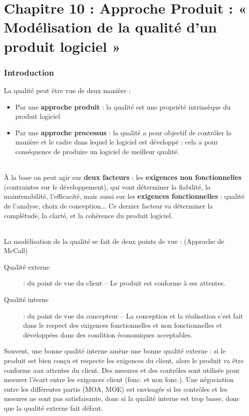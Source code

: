\part{Chapitre 10 : Approche Produit : « Modélisation de la qualité d’un produit logiciel »}

\section{Introduction}

La qualité peut être vue de deux manière :
\begin{itemize}
\item Par une \textbf{approche produit} : la qualité est une propriété intrinsèque du produit logiciel
\item Par une \textbf{approche processus} : la qualité a pour objectif de contrôler la manière et le cadre 	dans lequel le logiciel est développé : cela a pour conséquence de produire un logiciel de meilleur qualité.
\end{itemize}

\hfill\\

À la base on peut agir sur \textbf{deux facteurs} : les \textbf{exigences non fonctionnelles} (contraintes sur le développement), qui vont déterminer la fiabilité, la maintenabilité, l'efficacité, mais aussi sur les \textbf{exigences fonctionnelles} : qualité de l'analyse, choix de conception... Ce dernier facteur va déterminer la complétude, la clarté, et la cohérence du produit logiciel.

\hfill\\

La modélisation de la qualité se fait de deux points de vue : (Approche de McCall)
\begin{description}
\item[Qualité externe] : du point de vue du client – Le produit est conforme à ses attentes.
\item[Qualité interne] : du point  de vue du concepteur – La conception et la réalisation s'est fait dans le respect des exigences fonctionnelles et non fonctionnelles et développées dans des condition économiques acceptables.
\end{description}

Souvent, une bonne qualité interne amène une bonne qualité externe : si le produit est bien conçu et respecte les exigences du client, alors le produit va être conforme aux attentes du client. Des mesures et des contrôles sont utilisée pour mesurer l'écart entre les exigences client (fonc. et non fonc.). Une négociation entre les différentes partis (MOA, MOE) est envisagée si les contrôles et les mesures ne sont pas satisfaisante, donc si la qualité interne est trop basse, donc que la qualité externe fait défaut.

